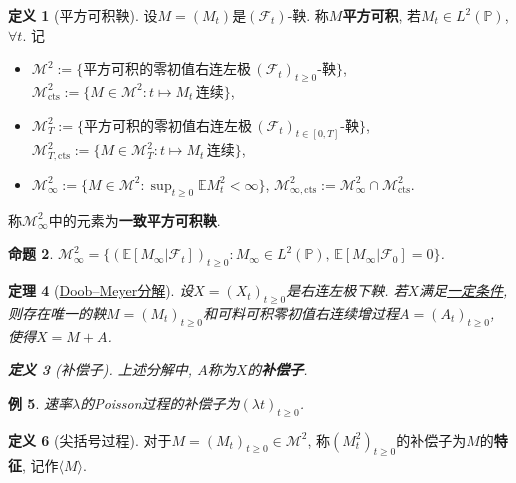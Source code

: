 \documentclass{ctexart}
\theoremstyle{definition}
\newtheorem{Def}{定义}[section]
\theoremstyle{remark}
\theoremstyle{plain}
\newtheorem{Prop}[Def]{命题}
\newtheorem{Thm}[Def]{定理}
\newtheorem{Eg}[Def]{例}
\newcommand{\1}{\mathbbm{1}}				%
\renewcommand{\P}{\mathbb{P}}				%
\newcommand{\E}{\mathbb{E}}					%
\newcommand{\agp}[1]{\langle #1 \rangle}	%
\begin{document}
\begin{Def}[平方可积鞅]
设$M = (M_{t})$是$(\mathscr{F}_{t})$-鞅. 称$M$\textbf{平方可积}, 若$M_{t} \in L^{2}(\P)$, $\forall t$. 记\begin{itemize}
	\item $\mathcal{M}^{2} := \{ \text{平方可积}\text{的}\text{零初值}\text{右连左极}\,(\mathscr{F}_{t})_{t \ge 0}\text{-鞅} \}$, $\mathcal{M}^{2}_{\mathrm{cts}} := \{ M\in\mathcal{M}^{2} : t \mapsto M_{t} \,\text{连续} \}$,
	\item $\mathcal{M}^{2}_{T} := \{ \text{平方可积}\text{的}\text{零初值}\text{右连左极}\,(\mathscr{F}_{t})_{t \in [0,T]}\text{-鞅} \}$, $\mathcal{M}^{2}_{T,\mathrm{cts}} := \{ M\in\mathcal{M}^{2}_{T} : t \mapsto M_{t} \,\text{连续} \}$,
	\item $\mathcal{M}^{2}_{\infty} := \{ M\in\mathcal{M}^{2} : \sup_{t \ge 0} \E M_{t}^{2} < \infty \}$, $\mathcal{M}^{2}_{\infty,\mathrm{cts}} := \mathcal{M}^{2}_{\infty}\cap\mathcal{M}^{2}_{\mathrm{cts}}$.
\end{itemize}
称$\mathcal{M}^{2}_{\infty}$中的元素为\textbf{一致平方可积鞅}.
\end{Def}

\begin{Prop}
$\mathcal{M}^{2}_{\infty} = \{ (\E[M_{\infty}|\mathscr{F}_{t}])_{t \ge 0} : M_{\infty} \in L^{2}(\P) ,\, \E[M_{\infty}|\mathscr{F}_{0}] = 0 \}$.
\end{Prop}

\begin{Thm}[\href{https://almostsuremath.com/2011/12/30/the-doob-meyer-decomposition/}{Doob--Meyer分解}]
设$X = (X_{t})_{t \ge 0}$是右连左极下鞅. 若$X$满足\href{https://almostsure.wordpress.com/2009/12/22/class-d-processes/}{一定条件}, 则存在唯一的鞅$M = (M_{t})_{t \ge 0}$和可料可积零初值右连续增过程$A = (A_{t})_{t \ge 0}$, 使得$X = M+A$.
\begin{Def}[补偿子]
上述分解中, $A$称为$X$的\textbf{补偿子}.
\end{Def}
\end{Thm}

\begin{Eg}
速率$\lambda$的Poisson过程的补偿子为$(\lambda t)_{t \ge 0}$.
\end{Eg}

\begin{Def}[尖括号过程]
对于$M = (M_{t})_{t \ge 0} \in \mathcal{M}^{2}$, 称$(M_{t}^{2})_{t \ge 0}$的补偿子为$M$的\textbf{特征}, 记作$\agp{M}$.
\end{Def}
\end{document}
